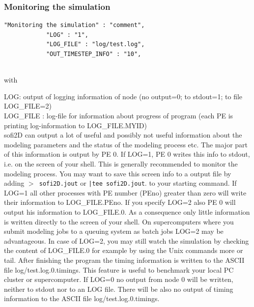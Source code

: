 \documentclass[11pt,onecolumn,oneside]{article}
\begin{document}

\subsubsection{Monitoring the simulation}
\begin{verbatim}
"Monitoring the simulation" : "comment",
			"LOG" : "1",	
			"LOG_FILE" : "log/test.log",
			"OUT_TIMESTEP_INFO" : "10",
			
\end{verbatim}

with

LOG: output of logging information of node (no output=0; to stdout=1; to file LOG\_FILE=2)\\
LOG\_FILE : log-file for information about progress of program (each PE is printing log-information to LOG\_FILE.MYID)\\


sofi2D can output a lot of useful and possibly not useful information about the modeling parameters and the status of the modeling process etc. The major part of this information is output by PE 0.
If LOG=1, PE 0 writes this info to stdout, i.e. on the screen of your shell. This is generally recommended  to monitor the modeling process. You may want to save this screen info to a output file by adding \texttt{$>$ sofi2D.jout} or \texttt{|tee sofi2D.jout}. to your starting command. If LOG=1 all other processes with PE number (PEno) greater than zero will write their information to LOG\_FILE.PEno. If you specify LOG=2 also PE 0 will output his information to LOG\_FILE.0. As a consequence only little information is written directly to the screen of your shell. On supercomputers where you submit modeling jobs to a queuing system as batch jobs LOG=2 may be advantageous. In case of LOG=2, you may still watch the simulation by checking the content of LOG\_FILE.0 for example by using the Unix commands more or tail. After finishing the program the timing information is written to the ASCII file log/test.log.0.timings. This feature is useful to benchmark your local PC cluster or supercomputer. If LOG=0 no output from node 0 will be written, neither to stdout nor to an LOG file. There will be also no output of timing information to the ASCII file log/test.log.0.timings. 
\end{document}
